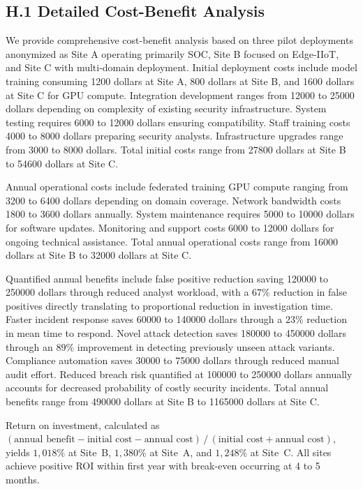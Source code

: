 \documentclass[12pt,a4paper]{article}
\theoremstyle{definition}
\begin{document}
\subsection{H.1 Detailed Cost-Benefit Analysis}

We provide comprehensive cost-benefit analysis based on three pilot deployments anonymized as Site A operating primarily SOC, Site B focused on Edge-IIoT, and Site C with multi-domain deployment. Initial deployment costs include model training consuming 1200 dollars at Site A, 800 dollars at Site B, and 1600 dollars at Site C for GPU compute. Integration development ranges from 12000 to 25000 dollars depending on complexity of existing security infrastructure. System testing requires 6000 to 12000 dollars ensuring compatibility. Staff training costs 4000 to 8000 dollars preparing security analysts. Infrastructure upgrades range from 3000 to 8000 dollars. Total initial costs range from 27800 dollars at Site B to 54600 dollars at Site C.

Annual operational costs include federated training GPU compute ranging from 3200 to 6400 dollars depending on domain coverage. Network bandwidth costs 1800 to 3600 dollars annually. System maintenance requires 5000 to 10000 dollars for software updates. Monitoring and support costs 6000 to 12000 dollars for ongoing technical assistance. Total annual operational costs range from 16000 dollars at Site B to 32000 dollars at Site C.

Quantified annual benefits include false positive reduction saving 120000 to 250000 dollars through reduced analyst workload, with a $67\%$ reduction in false positives directly translating to proportional reduction in investigation time. Faster incident response saves 60000 to 140000 dollars through a $23\%$ reduction in mean time to respond. Novel attack detection saves 180000 to 450000 dollars through an $89\%$ improvement in detecting previously unseen attack variants. Compliance automation saves 30000 to 75000 dollars through reduced manual audit effort. Reduced breach risk quantified at 100000 to 250000 dollars annually accounts for decreased probability of costly security incidents. Total annual benefits range from 490000 dollars at Site B to 1165000 dollars at Site C.

Return on investment, calculated as $(\text{annual benefit} - \text{initial cost} - \text{annual cost})\,/\,(\text{initial cost} + \text{annual cost})$, yields $1{,}018\%$ at Site~B, $1{,}380\%$ at Site~A, and $1{,}248\%$ at Site~C. All sites achieve positive ROI within first year with break-even occurring at 4 to 5 months.
\end{document}
